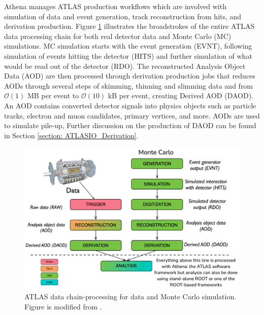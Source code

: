 Athena manages ATLAS production workflows which are involved with simulation of data and event generation, track reconstruction from hits, and derivation production.\cite{athenadocs}
Figure \ref{fig:ATLAS_data_chain} illustrates the broadstrokes of the entire ATLAS data processing chain for both real detector data and Monte Carlo (MC) simulations. 
MC simulation starts with the event generation (EVNT), following simulation of events hitting the detector (HITS) and further simulation of what would be read out of the detector (RDO).
The reconstructed Analysis Object Data (AOD) are then processed through derivation production jobs that reduces AODs through several steps of skimming, thinning and slimming data and from $\mathcal{O}(1)$ MB per event to $\mathcal{O}(10)$ kB per event, creating Derived AOD (DAOD).
An AOD contains converted detector signals into physics objects such as particle tracks, electron and muon candidates, primary vertices, and more.\cite{Aad:2895022}
AODs are used to simulate pile-up, 
Further discussion on the production of DAOD can be found in Section \ref{section: ATLASIO_Derivation}.
\begin{figure}[ht]
    \centering
    \includegraphics[width=\textwidth]{content/img/modified-James-chain-processing.png}
    \caption{ATLAS data chain-processing for data and Monte Carlo simulation. Figure is modified from \cite{James_Catmore_chain_processing}.}
    \label{fig:ATLAS_data_chain}
\end{figure}



